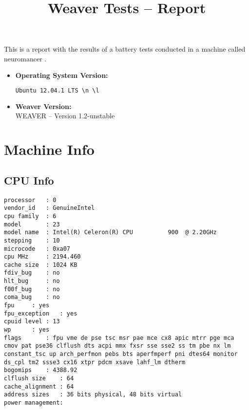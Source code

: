 \documentclass{article}
\title{Weaver Tests -- Report}
\begin{document}
\maketitle
This is a report with the results of a battery
tests conducted in a machine called 
neuromancer
.
\begin{itemize}
\item
\textbf{Operating System Version: }
\begin{verbatim}
Ubuntu 12.04.1 LTS \n \l

\end{verbatim}
\item
\textbf{Weaver Version: }\\
WEAVER -- Version 1.2-unstable
\end{itemize}
\section{Machine Info}
\subsection{CPU Info}
\begin{verbatim}
processor	: 0
vendor_id	: GenuineIntel
cpu family	: 6
model		: 23
model name	: Intel(R) Celeron(R) CPU          900  @ 2.20GHz
stepping	: 10
microcode	: 0xa07
cpu MHz		: 2194.460
cache size	: 1024 KB
fdiv_bug	: no
hlt_bug		: no
f00f_bug	: no
coma_bug	: no
fpu		: yes
fpu_exception	: yes
cpuid level	: 13
wp		: yes
flags		: fpu vme de pse tsc msr pae mce cx8 apic mtrr pge mca cmov pat pse36 clflush dts acpi mmx fxsr sse sse2 ss tm pbe nx lm constant_tsc up arch_perfmon pebs bts aperfmperf pni dtes64 monitor ds_cpl tm2 ssse3 cx16 xtpr pdcm xsave lahf_lm dtherm
bogomips	: 4388.92
clflush size	: 64
cache_alignment	: 64
address sizes	: 36 bits physical, 48 bits virtual
power management:

\end{verbatim}
\end{document}
